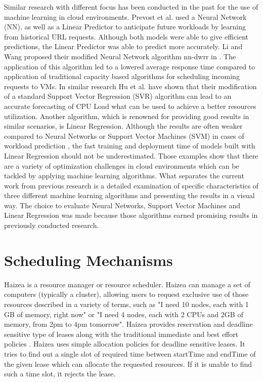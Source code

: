 Similar research with different focus has been conducted in the past for the use of machine learning in cloud environments. Prevost et al. used a Neural Network (NN), as well as a Linear Predictor \cite{prevost2011prediction} to anticipate future workloads by learning from historical URL requests. Although both models were able to give efficient predictions, the Linear Predictor was able to predict more accurately. Li and Wang proposed their modified Neural Network algorithm nn-dwrr in \cite{li2014sla}. The application of this algorithm led to a lowered average response time compared to application of traditional capacity based algorithms for scheduling incoming requests to VMs. In similar research Hu et al. \cite{hu2013kswsvr} have shown that their modification of a standard Support Vector Regression (SVR) algorithm can lead to an accurate forecasting of CPU Load what can be used to achieve a better resources utilization. Another algorithm, which is renowned for providing good results in similar scenarios, is Linear Regression. Although the results are often weaker compared to Neural Networks or Support Vector Machines (SVM) in cases of workload prediction \cite{bankole2013predicting} \cite{imam2011neural}, the fast training and deployment time of models built with Linear Regression should not be underestimated. Those examples show that there are a variety of optimization challenges in cloud environments which can be tackled by applying machine learning algorithms. What separates the current work from previous research is a detailed examination of specific characteristics of three different machine learning algorithms and presenting the results in a visual way. The choice to evaluate Neural Networks, Support Vector Machines and Linear Regression was made because those algorithms earned promising results in previously conducted research.


\section{Scheduling Mechanisms}

Haizea \cite{haizea2} is a resource manager or resource scheduler. Haizea  can manage a set of computers (typically a cluster), allowing users to request exclusive use of those resources described in a variety of terms, such as "I need 10 nodes, each with 1 GB of memory, right now" or "I need 4 nodes, each with 2 CPUs and 2GB of memory, from 2pm to 4pm tomorrow". Haizea provides reservation and deadline sensitive type of leases along with the traditional immediate and best effort policies \cite{haizea1} \cite{haizea3} \cite{haizea4}. Haizea uses simple allocation policies for deadline sensitive leases. It tries to find out a single slot of required time between startTime and endTime of the given lease which can allocate the requested resources. If it is unable to ﬁnd such a time slot, it rejects the lease. 

